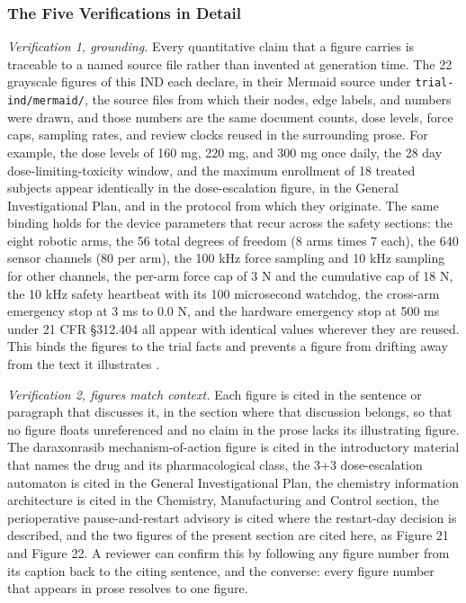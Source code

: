 \subsubsection{The Five Verifications in Detail}

\textit{Verification 1, grounding.} Every quantitative claim that a figure carries
is traceable to a named source file rather than invented at generation time. The
22 grayscale figures of this IND each declare, in their Mermaid source under
\texttt{trial-ind/mermaid/}, the source files from which their nodes, edge labels,
and numbers were drawn, and those numbers are the same document counts, dose
levels, force caps, sampling rates, and review clocks reused in the surrounding
prose. For example, the dose levels of 160 mg, 220 mg, and 300 mg once daily, the
28 day dose-limiting-toxicity window, and the maximum enrollment of 18 treated
subjects appear identically in the dose-escalation figure, in the General
Investigational Plan, and in the protocol from which they originate. The same
binding holds for the device parameters that recur across the safety sections:
the eight robotic arms, the 56 total degrees of freedom (8 arms times 7 each), the
640 sensor channels (80 per arm), the 100 kHz force sampling and 10 kHz sampling
for other channels, the per-arm force cap of 3 N and the cumulative cap of 18 N,
the 10 kHz safety heartbeat with its 100 microsecond watchdog, the cross-arm
emergency stop at 3 ms to 0.0 N, and the hardware emergency stop at 500 ms under
21 CFR \S 312.404 all appear with identical values wherever they are reused. This
binds the figures to the trial facts and prevents a figure from drifting away from
the text it illustrates \cite{oncotrialllm, pdacdigtwinp}.

\textit{Verification 2, figures match context.} Each figure is cited in the
sentence or paragraph that discusses it, in the section where that discussion
belongs, so that no figure floats unreferenced and no claim in the prose lacks its
illustrating figure. The daraxonrasib mechanism-of-action figure is cited in the
introductory material that names the drug and its pharmacological class, the 3+3
dose-escalation automaton is cited in the General Investigational Plan, the
chemistry information architecture is cited in the Chemistry, Manufacturing and
Control section, the perioperative pause-and-restart advisory is cited where the
restart-day decision is described, and the two figures of the present section are
cited here, as Figure 21 and Figure 22. A reviewer can confirm this by following
any figure number from its caption back to the citing sentence, and the converse:
every figure number that appears in prose resolves to one figure.

